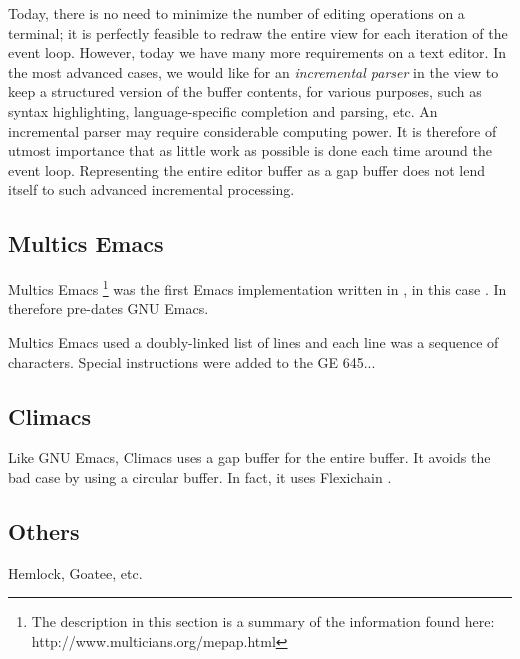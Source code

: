 Today, there is no need to minimize the number of editing operations
on a terminal; it is perfectly feasible to redraw the entire view for
each iteration of the event loop.  However, today we have many more
requirements on a text editor.  In the most advanced cases, we would
like for an \emph{incremental parser} in the view to keep a structured
version of the buffer contents, for various purposes, such as syntax
highlighting, language-specific completion and parsing, etc.  An
incremental parser may require considerable computing power.  It is
therefore of utmost importance that as little work as possible is done
each time around the event loop.  Representing the entire editor
buffer as a gap buffer does not lend itself to such advanced
incremental processing.

\subsection{Multics Emacs}


Multics Emacs%
\footnote{The description in this section is a summary of the
  information found here: http://www.multicians.org/mepap.html}
was the first Emacs implementation written in \lisp{}, in this case
\multics{} \maclisp{}.  In therefore pre-dates GNU Emacs.

Multics Emacs used a doubly-linked list of lines and each line was a
sequence of characters.  Special instructions were added to the GE
645...

\subsection{Climacs}

Like GNU Emacs, Climacs uses a gap buffer for the entire buffer.  It
avoids the bad case by using a circular buffer.  In fact, it uses
Flexichain \cite{flexichain}.

\subsection{Others}

Hemlock, Goatee, etc.

